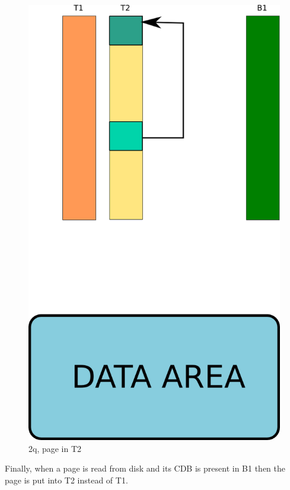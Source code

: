\begin{figure}[H]
\includegraphics[scale=0.4]{images/2q_03.png}

\caption{2q, page in T2}

\end{figure}

Finally, when a page is read from disk and its CDB is present in B1 then the page is put into T2 instead of 
T1.\newline

